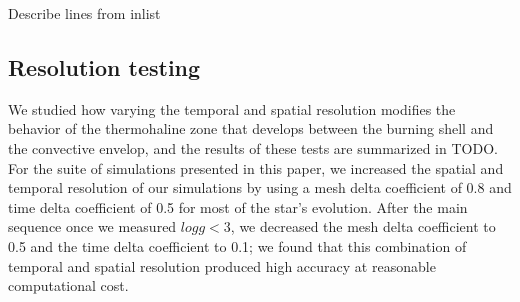 {\color{red} Describe lines from inlist}

\subsection{Resolution testing}
We studied how varying the temporal and spatial resolution modifies the behavior of the thermohaline zone that develops between the burning shell and the convective envelop, and the results of these tests are summarized in TODO.
For the suite of simulations presented in this paper, we increased the spatial and temporal resolution of our simulations by using a mesh delta coefficient of 0.8 and time delta coefficient of 0.5 for most of the star's evolution.
After the main sequence once we measured $log g < 3$, we decreased the mesh delta coefficient to 0.5 and the time delta coefficient to 0.1; we found that this combination of temporal and spatial resolution produced high accuracy at reasonable computational cost.

